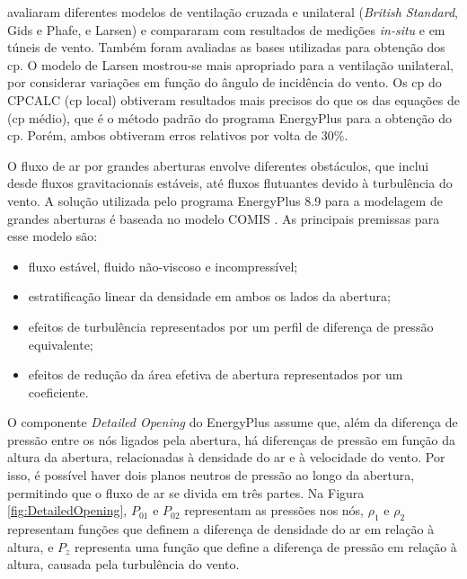  avaliaram diferentes modelos de ventilação cruzada e unilateral (\textit{British Standard}, Gids e Phafe, e Larsen) e compararam com resultados de medições \textit{in-situ} e em túneis de vento. Também foram avaliadas as bases utilizadas para obtenção dos \acrshort{cp}. 
O modelo de Larsen mostrou-se mais apropriado para a ventilação unilateral, por considerar variações em função do ângulo de incidência do vento. Os \acrshort{cp} do CPCALC (\acrshort{cp} local) obtiveram resultados mais precisos do que os das equações de  (\acrshort{cp} médio), que é o método padrão do programa EnergyPlus \cite{EnergyPlus2018} para a obtenção do \acrshort{cp}. Porém, ambos obtiveram erros relativos por volta de 30\%.

O fluxo de ar por grandes aberturas envolve diferentes obstáculos, que inclui desde fluxos gravitacionais estáveis, até fluxos flutuantes devido à turbulência do vento. A solução utilizada pelo programa EnergyPlus 8.9 \cite{EnergyPlus2018} para a modelagem de grandes aberturas é baseada no modelo COMIS \cite{Feustel1990}. As principais premissas para esse modelo são:

\begin{itemize}
	\item fluxo estável, fluido não-viscoso e incompressível;
	\item estratificação linear da densidade em ambos os lados da abertura;
	\item efeitos de turbulência representados por um perfil de diferença de pressão equivalente;
	\item efeitos de redução da área efetiva de abertura representados por um coeficiente.
\end{itemize}

O componente \textit{Detailed Opening} do EnergyPlus \cite{EnergyPlus2018} assume que, além da diferença de pressão entre os nós ligados pela abertura, há diferenças de pressão em função da altura da abertura, relacionadas à densidade do ar e à velocidade do vento. Por isso, é possível haver dois planos neutros de pressão ao longo da abertura, permitindo que o fluxo de ar se divida em três partes. 
Na Figura \ref{fig:DetailedOpening}, $P_{01}$ e $P_{02}$ representam as pressões nos nós, $\rho_{1}$ e $\rho_{2}$ representam funções que definem a diferença de densidade do ar em relação à altura, e $P_z$ representa uma função que define a diferença de pressão em relação à altura, causada pela turbulência do vento.


